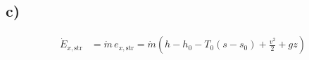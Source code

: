 

\subsection*{c)}
\begin{align*}
\dot{E}_{x, \text{str}} &= \dot{m} \, e_{x, \text{str}} = \dot{m} \left( h - h_0 - T_0 (s - s_0) + \frac{v^2}{2} + gz \right)
\end{align*}